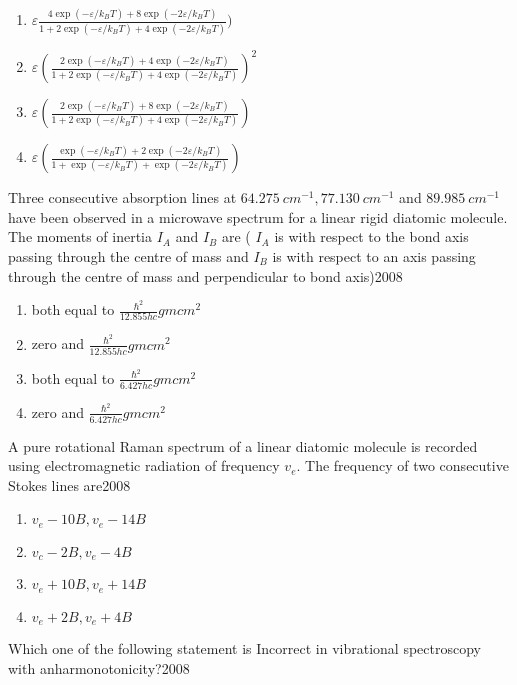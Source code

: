             \begin{enumerate}
              \item  $\varepsilon\frac{4 \exp (-\varepsilon / k_{B} T)+8 \exp (-2 \varepsilon / k_{B} T)}{1+2 \exp (-\varepsilon / k_{B} T)+4 \exp (-2 \varepsilon / k_{B} T)})$
              \item $\varepsilon(\frac{2 \exp (-\varepsilon / k_{B} T)+4 \exp (-2 \varepsilon / k_{B} T)}{1+2 \exp (-\varepsilon / k_{B} T)+4 \exp (-2 \varepsilon / k_{B} T)})^{2}$
              \item $\varepsilon(\frac{2 \exp (-\varepsilon / k_{B} T)+8 \exp (-2 \varepsilon / k_{B} T)}{1+2 \exp (-\varepsilon / k_{B} T)+4 \exp (-2 \varepsilon / k_{B} T)})$
              \item $\varepsilon(\frac{\exp (-\varepsilon / k_{B} T)+2 \exp (-2 \varepsilon / k_{B} T)}{1+\exp (-\varepsilon / k_{B} T)+\exp (-2 \varepsilon / k_{B} T)})$
            \end{enumerate}
       
    \item  Three consecutive absorption lines at $64.275 {~cm}^{-1}, 77.130 {~cm}^{-1}$ and $89.985 {~cm}^{-1}$ have been observed in a microwave spectrum for a linear rigid diatomic molecule. The moments of inertia $I_{A}$ and $I_{B}$ are ( $I_{A}$ is with respect to the bond axis passing through the centre of mass and $I_{B}$ is with respect to an axis passing through the centre of mass and perpendicular to bond axis)\hfill{2008}
   
            \begin{enumerate}
              \item  both equal to $\frac{\hbar^{2}}{12.855 h c} {gm} {cm}^{2}$
              \item zero and $\frac{\hbar^{2}}{12.855 {hc}} {gm} {cm}^{2}$
              \item both equal to $\frac{\hbar^{2}}{6.427 h c} {gm} {cm}^{2}$
              \item zero and $\frac{\hbar^{2}}{6.427 h c} {gm} {cm}^{2}$
            \end{enumerate}
       
        \item A pure rotational Raman spectrum of a linear diatomic molecule is recorded using electromagnetic radiation of frequency $v_{e}$. The frequency of two consecutive Stokes lines are\hfill{2008}
        \begin{multicols}{1}
            \begin{enumerate}
              \item  $v_{e}-10 B, v_{e}-14 B$
              \item  $v_{c}-2 B,  v_{e}-4 B$
              \item $v_{e}+10 B,  v_{e}+14 B$
              \item $v_{e}+2 B,  v_{e}+4 B$
            \end{enumerate}
        \end{multicols}
        \item Which one of the following statement is Incorrect in  vibrational spectroscopy with anharmonotonicity?\hfill{2008}
        
